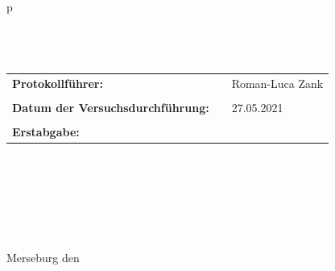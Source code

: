 \begin{center}
\begin{tabular}{p{\textwidth}}
\\ \\ \\ \\

\begin{center}
\begin{tabular}{lll}
\large{\textbf{Protokollführer:}} & & \large{Roman-Luca Zank}\\
&&\\
\large{\textbf{Datum der Versuchsdurchführung:}}&& \large{27.05.2021}\\
&&\\
\large{\textbf{Erstabgabe:}}&& \large{\todayDE}\\
\end{tabular}
\end{center}

\\ \\ \\ \\ \\ \\ 

\large{Merseburg den \todayDE}

\end{tabular}
\end{center}
